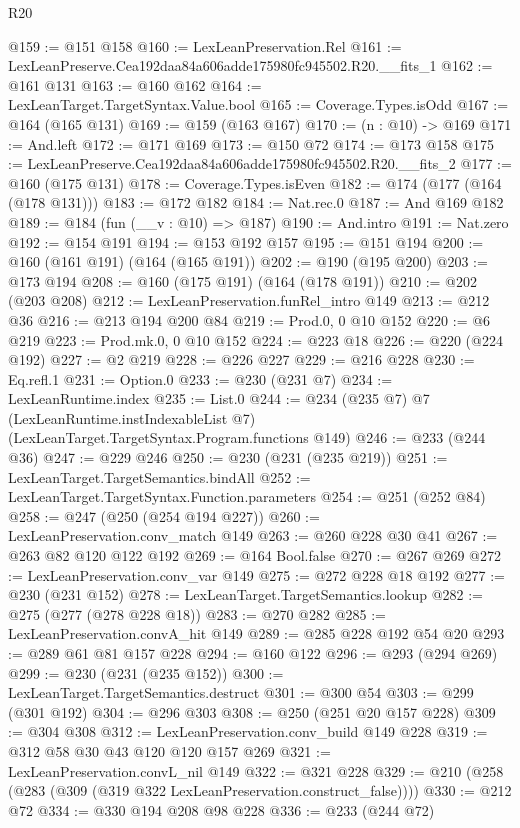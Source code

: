 \begin{lexlean}{R20}
\begin{coremodule}
@159 := @151 @158
@160 := LexLeanPreservation.Rel
@161 := LexLeanPreserve.Cea192daa84a606adde175980fc945502.R20.__fits_1
@162 := @161 @131
@163 := @160 @162
@164 := LexLeanTarget.TargetSyntax.Value.bool
@165 := Coverage.Types.isOdd
@167 := @164 (@165 @131)
@169 := @159 (@163 @167)
@170 := (n : @10) -> @169
@171 := And.left
@172 := @171 @169
@173 := @150 @72
@174 := @173 @158
@175 := LexLeanPreserve.Cea192daa84a606adde175980fc945502.R20.__fits_2
@177 := @160 (@175 @131)
@178 := Coverage.Types.isEven
@182 := @174 (@177 (@164 (@178 @131)))
@183 := @172 @182
@184 := Nat.rec.{0}
@187 := And @169 @182
@189 := @184 (fun (__v : @10) => @187)
@190 := And.intro
@191 := Nat.zero
@192 := @154 @191
@194 := @153 @192 @157
@195 := @151 @194
@200 := @160 (@161 @191) (@164 (@165 @191))
@202 := @190 (@195 @200)
@203 := @173 @194
@208 := @160 (@175 @191) (@164 (@178 @191))
@210 := @202 (@203 @208)
@212 := LexLeanPreservation.funRel_intro @149
@213 := @212 @36
@216 := @213 @194 @200 @84
@219 := Prod.{0, 0} @10 @152
@220 := @6 @219
@223 := Prod.mk.{0, 0} @10 @152
@224 := @223 @18
@226 := @220 (@224 @192)
@227 := @2 @219
@228 := @226 @227
@229 := @216 @228
@230 := Eq.refl.{1}
@231 := Option.{0}
@233 := @230 (@231 @7)
@234 := LexLeanRuntime.index
@235 := List.{0}
@244 := @234
    (@235 @7)
    @7
    (LexLeanRuntime.instIndexableList @7)
    (LexLeanTarget.TargetSyntax.Program.functions @149)
@246 := @233 (@244 @36)
@247 := @229 @246
@250 := @230 (@231 (@235 @219))
@251 := LexLeanTarget.TargetSemantics.bindAll
@252 := LexLeanTarget.TargetSyntax.Function.parameters
@254 := @251 (@252 @84)
@258 := @247 (@250 (@254 @194 @227))
@260 := LexLeanPreservation.conv_match @149
@263 := @260 @228 @30 @41
@267 := @263 @82 @120 @122 @192
@269 := @164 Bool.false
@270 := @267 @269
@272 := LexLeanPreservation.conv_var @149
@275 := @272 @228 @18 @192
@277 := @230 (@231 @152)
@278 := LexLeanTarget.TargetSemantics.lookup
@282 := @275 (@277 (@278 @228 @18))
@283 := @270 @282
@285 := LexLeanPreservation.convA_hit @149
@289 := @285 @228 @192 @54 @20
@293 := @289 @61 @81 @157 @228
@294 := @160 @122
@296 := @293 (@294 @269)
@299 := @230 (@231 (@235 @152))
@300 := LexLeanTarget.TargetSemantics.destruct
@301 := @300 @54
@303 := @299 (@301 @192)
@304 := @296 @303
@308 := @250 (@251 @20 @157 @228)
@309 := @304 @308
@312 := LexLeanPreservation.conv_build @149 @228
@319 := @312 @58 @30 @43 @120 @120 @157 @269
@321 := LexLeanPreservation.convL_nil @149
@322 := @321 @228
@329 := @210 (@258 (@283 (@309 (@319 @322 LexLeanPreservation.construct_false))))
@330 := @212 @72
@334 := @330 @194 @208 @98 @228
@336 := @233 (@244 @72)

\end{coremodule}
\end{lexlean}
